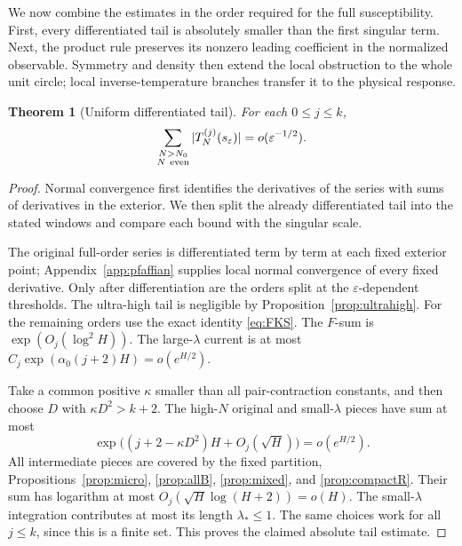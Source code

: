 \documentclass[11pt]{article}
\numberwithin{equation}{section}
\newtheorem{theorem}{Theorem}[section]
\theoremstyle{definition}
\newcommand{\eps}{\varepsilon}
\newcommand{\se}{s_\varepsilon}
\begin{document}
We now combine the estimates in the order required for the full
susceptibility. First, every differentiated tail is absolutely smaller
than the first singular term. Next, the product rule preserves its
nonzero leading coefficient in the normalized observable. Symmetry and
density then extend the local obstruction to the whole unit circle;
local inverse-temperature branches transfer it to the physical response.
\begin{theorem}[Uniform differentiated tail]\label{thm:tail}
For each \(0\le j\le k\),
\[
 \sum_{\substack{N>N_0\\N\ {\rm even}}}|T_N^{(j)}(\se)|
                =o(\eps^{-1/2}).
\]
\end{theorem}
\begin{proof}
Normal convergence first identifies the derivatives of the series with sums of derivatives in the exterior. We then split the already differentiated tail into the stated windows and compare each bound with the singular scale.

The original full-order series is differentiated term by term at each
fixed exterior point; Appendix~\ref{app:pfaffian} supplies local normal
convergence of every fixed derivative. Only after differentiation are
the orders split at the \(\eps\)-dependent thresholds.
The ultra-high tail is negligible by Proposition~\ref{prop:ultrahigh}.
For the remaining orders use the exact identity \eqref{eq:FKS}.
The \(F\)-sum is \(\exp(O_j(\log^2H))\).
The large-\(\lambda\) current is at most
\(C_j\exp(\alpha_0(j+2)H)=o(e^{H/2})\).

Take a common positive \(\kappa\) smaller than all pair-contraction
constants, and then choose \(D\) with \(\kappa D^2>k+2\).
The high-\(N\) original and small-\(\lambda\) pieces have sum at most
\[
 \exp\bigl((j+2-\kappa D^2)H+O_j(\sqrt H)\bigr)=o(e^{H/2}).
\]
All intermediate pieces are covered by the fixed partition,
Propositions~\ref{prop:micro}, \ref{prop:allB}, \ref{prop:mixed},
and \ref{prop:compactR}. Their sum has logarithm at most
\(O_j(\sqrt H\log(H+2))=o(H)\).
The small-\(\lambda\) integration contributes at most its length
\(\lambda_*\le1\). The same choices work for all \(j\le k\), since
this is a finite set. This proves the claimed absolute tail estimate.
\end{proof}
\end{document}
